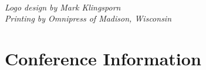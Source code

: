 \documentclass[twoside,makeidx]{book}
\begin{document}


\fancyfoot[C]{}

\thispagestyle{empty}


\clearpage
\thispagestyle{empty}

\noindent ~\\
\emph{Logo design by Mark Klingsporn}\\
\emph{Printing by Omnipress of Madison, Wisconsin}

\newpage
\cleardoublepage
\fancyfoot[C]{\thepage}
\frontmatter


\setcounter{tocdepth}{2}
\tableofcontents
\mainmatter
\pagestyle{fancy}


\chapter{Conference Information}


\clearpage


\clearpage%
\setheaders{}{}


%
\clearpage%
\setheaders{}{}

%
\clearpage






\end{document}
